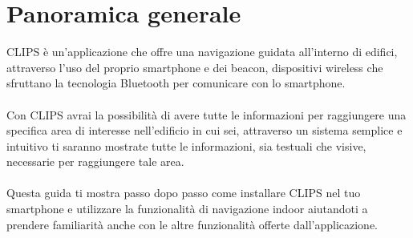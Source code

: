 \documentclass[../ClipsManualeUtente.tex]{subfiles}
\begin{document}
\section{Panoramica generale}

	CLIPS è un'applicazione che offre una navigazione guidata all'interno di edifici, attraverso l'uso del proprio smartphone e dei beacon, dispositivi wireless che sfruttano la tecnologia Bluetooth per comunicare con lo smartphone. 
	\paragraph*{}
	Con CLIPS avrai la possibilità di avere tutte le informazioni per raggiungere una specifica area di interesse nell'edificio in cui sei, attraverso un sistema semplice e intuitivo ti saranno mostrate tutte le informazioni, sia testuali che visive, necessarie per raggiungere tale area.
	\paragraph*{}
	Questa guida ti mostra passo dopo passo come installare CLIPS nel tuo smartphone e utilizzare la funzionalità di navigazione indoor aiutandoti a prendere familiarità anche con le altre funzionalità offerte dall'applicazione.
	
\end{document}
